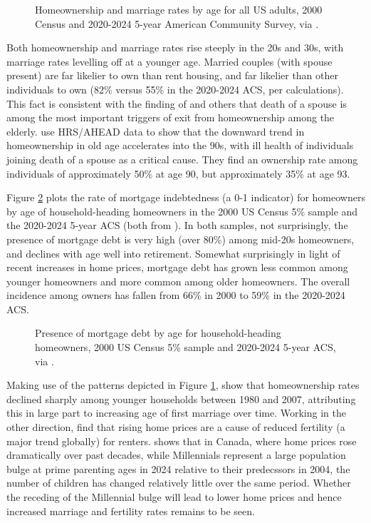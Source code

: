 \documentclass[12pt]{article}
\begin{document}
\begin{figure}
	\caption{\label{fig:ageMarriageOwnershipIPUMS} Homeownership and
marriage rates by age for all US adults, 2000 Census and 2020-2024 5-year
American Community Survey, via \textcite{IPUMS}.}
 \end{figure}


Both homeownership and marriage rates rise steeply in the 20s and 30s, with
marriage rates levelling off at a younger age. Married couples (with spouse
present) are far likelier to own than rent housing, and far likelier than other
individuals to own (82\% versus 55\% in the 2020-2024 ACS, per \textcite{IPUMS}
calculations). This fact is consistent with the finding of \textcite{VentiWise}
and others that death of a spouse is among the most important triggers of exit
from homeownership among the elderly. \textcite{CoileMilligan} use HRS/AHEAD
data to show that the downward trend in homeownership in old age accelerates
into the 90s, with ill health of individuals joining death of a spouse as a
critical cause. They find an ownership rate among individuals of approximately
50\% at age 90, but approximately 35\% at age 93.

Figure \ref{fig:mortgageStatusByAge} plots the rate of mortgage indebtedness (a
0-1 indicator) for homeowners by age of household-heading homeowners in the
2000 US Census 5\% sample  and the 2020-2024 5-year ACS (both from
\textcite{IPUMS}). In both samples, not surprisingly, the presence of mortgage
debt is very high (over 80\%) among mid-20s homeowners, and declines with age
well into retirement. Somewhat surprisingly in light of recent increases in
home prices, mortgage debt has grown less common among younger homeowners and more
common among older homeowners. The overall incidence among owners has fallen
from 66\% in 2000 to 59\% in the 2020-2024 ACS. 

\begin{figure}
	\caption{\label{fig:mortgageStatusByAge} Presence of mortgage debt by age for household-heading homeowners, 2000 US Census 5\% sample and 2020-2024 5-year ACS, via \textcite{IPUMS}.}
\end{figure}
 
Making use of the patterns depicted in Figure \ref{fig:ageMarriageOwnershipIPUMS},
\textcite{FisherGervais} show that homeownership rates declined sharply among
younger households between 1980 and 2007, attributing this in large part to
increasing age of first marriage over time. Working in the other direction,
\textcite{Kearney} find that rising home prices are a cause of reduced
fertility (a major trend globally) for renters. \textcite{StatsCan2024} shows that in
Canada, where home prices rose dramatically over past decades, while
Millennials represent a large population bulge at prime parenting ages in 2024
relative to their predecssors in 2004, the number of children has changed
relatively little over the same period. Whether the receding of the Millennial
bulge will lead to lower home prices and hence increased marriage and fertility
rates remains to be seen.
\end{document}
